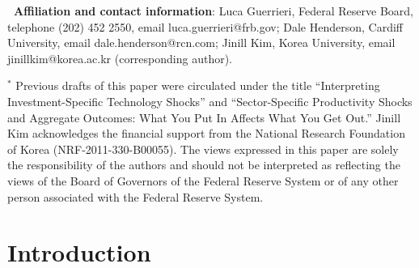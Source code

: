 \documentclass[12pt,fleqn]{article}
\renewcommand{\baselinestretch}{1.5}
\begin{document}
\renewcommand{\baselinestretch}{1} {\footnotesize \noindent }

{\footnotesize \textbf{\ Affiliation and contact information}: Luca
Guerrieri, Federal Reserve Board, telephone (202) 452 2550, email
luca.guerrieri@frb.gov; Dale Henderson, Cardiff University, email
dale.henderson@rcn.com; Jinill Kim, Korea University, email
jinillkim@korea.ac.kr (corresponding author).}

{\footnotesize \vspace{1cm} }

{\footnotesize \noindent $^{*}$ Previous drafts of this paper were
circulated under the title ``Interpreting Investment-Specific Technology
Shocks'' and ``Sector-Specific Productivity Shocks and Aggregate Outcomes: What You Put In Affects What You Get Out.''
Jinill Kim acknowledges the financial support from the National Research Foundation of Korea (NRF-2011-330-B00055).
The views expressed in this paper are solely the responsibility of
the authors and should not be interpreted as reflecting the views of the
Board of Governors of the Federal Reserve System or of any other person
associated with the Federal Reserve System. }

\clearpage \renewcommand{\baselinestretch}{1.5} \normalsize

\section{\protect\normalsize Introduction}
\end{document}
